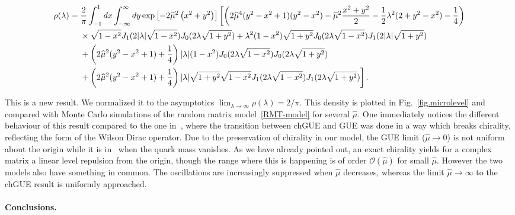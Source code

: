\documentclass[aps,prl,reprint,graphicx,showpacs]{revtex4-1}
\begin{document}
\begin{widetext}
\begin{align}
\rho(\lambda)=\;&\frac{2}{\pi}\int_{-1}^1 dx\int_{-\infty}^\infty dy\exp\left[-2\widehat{\mu}^2\left(x^2+y^2\right)\right]\biggl[\left(2\widehat{\mu}^4(y^2-x^2+1)(y^2-x^2)-\widehat{\mu}^2\frac{x^2+y^2}{2}-\frac{1}{2}\lambda^2(2+y^2-x^2)-\frac{1}{4}\right)\notag\\
&\times\sqrt{1-x^2} J_1(2|\lambda|\sqrt{1-x^2})J_0(2\lambda\sqrt{1+y^2})+\lambda^2(1-x^2)\sqrt{1+y^2}J_0(2\lambda\sqrt{1-x^2})J_1(2|\lambda|\sqrt{1+y^2})\notag\\
&+\left(2\widehat{\mu}^2(y^2-x^2+1)+\frac{1}{4}\right)|\lambda|(1-x^2)J_0(2\lambda\sqrt{1-x^2})J_0(2\lambda\sqrt{1+y^2})\notag\\
&+\left(2\widehat{\mu}^2(y^2-x^2+1)+\frac{1}{4}\right)|\lambda|\sqrt{1+y^2}\sqrt{1-x^2}J_1(2\lambda\sqrt{1-x^2})J_1(2\lambda\sqrt{1+y^2})\biggl]\,.
\label{level.density}
\end{align}
\end{widetext}
This is a new result. We normalized it to the asymptotics $\lim_{\lambda\to\infty}\rho(\lambda)=2/\pi$.
This density is plotted in Fig.~\ref{fig.microlevel} and compared with Monte Carlo simulations of the random matrix model~\eqref{RMT-model} for several $\widehat{\mu}$. One immediately notices the different behaviour of this result compared to the one in~\cite{Damgaard:2010cz,Akemann:2011}, where the transition between chGUE and GUE was done in a way which breaks chirality, reflecting the form of the Wilson Dirac operator. Due to the preservation of chirality in our model, the GUE limit ($\widehat{\mu}\to0$) is not uniform about the origin while it is in~\cite{Damgaard:2010cz,Akemann:2011} when the quark mass vanishes. As we have already pointed out, an exact chirality yields for a complex matrix a linear level repulsion from the origin, though the range where this is happening is of order $\mathcal{O}(\widehat{\mu})$ for small $\widehat{\mu}$. However the two models also have something in common. The oscillations are increasingly suppressed when $\widehat{\mu}$ decreases, whereas the limit $\widehat{\mu}\to\infty$ to the chGUE result is uniformly approached.

\paragraph{Conclusions.}
\end{document}
